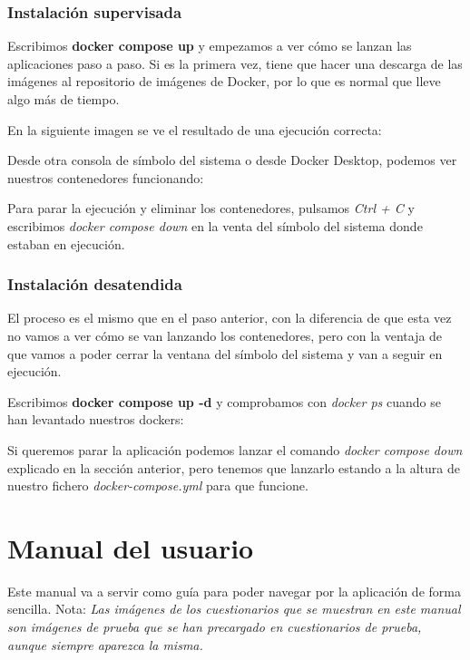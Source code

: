 \subsubsection{Instalación supervisada}

Escribimos \textbf{docker compose up} y empezamos a ver cómo se lanzan las aplicaciones paso a paso. Si es la primera vez, tiene que hacer una descarga de las imágenes al repositorio de imágenes de Docker, por lo que es normal que lleve algo más de tiempo.

En la siguiente imagen se ve el resultado de una ejecución correcta:

Desde otra consola de símbolo del sistema o desde Docker Desktop, podemos ver nuestros contenedores funcionando:

Para parar la ejecución y eliminar los contenedores, pulsamos \textit{Ctrl + C} y escribimos \textit{docker compose down} en la venta del símbolo del sistema donde estaban en ejecución.

\subsubsection{Instalación desatendida}

El proceso es el mismo que en el paso anterior, con la diferencia de que esta vez no vamos a ver cómo se van lanzando los contenedores, pero con la ventaja de que vamos a poder cerrar la ventana del símbolo del sistema y van a seguir en ejecución.

Escribimos \textbf{docker compose up -d} y comprobamos con \textit{docker ps} cuando se han levantado nuestros dockers:

Si queremos parar la aplicación podemos lanzar el comando \textit{docker compose down} explicado en la sección anterior, pero tenemos que lanzarlo estando a la altura de nuestro fichero \textit{docker-compose.yml} para que funcione.

\section{Manual del usuario}

Este manual va a servir como guía para poder navegar por la aplicación de forma sencilla.
Nota: \textit{Las imágenes de los cuestionarios que se muestran en este manual son imágenes de prueba que se han precargado en cuestionarios de prueba, aunque siempre aparezca la misma.}

